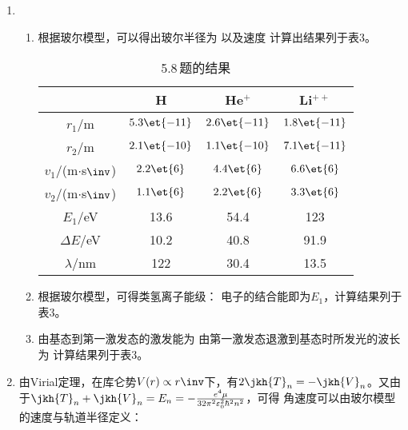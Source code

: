 \begin{enumerate}[label=\textbf{5.\arabic*}, listparindent=\parindent]
\item 
\begin{enumerate}[label=(\arabic*)]
    \item 根据玻尔模型，可以得出玻尔半径为
    以及速度
    计算出结果列于表3。
    \begin{table}[h]
        \centering
        \begin{tabular}{c|c|c|c}
            \hline
            & H & He$^+$ & Li$^{++}$ \\
            \hline
            $r_1$/m & $5.3\et{-11}$ & $2.6\et{-11}$ & $1.8\et{-11}$ \\
            $r_2$/m & $2.1\et{-10}$ & $1.1\et{-10}$ & $7.1\et{-11}$ \\
            \hline
            $v_1$/(m$\cdot$s$\inv$) & $2.2\et{6}$ & $4.4\et{6}$ & $6.6\et{6}$ \\
            $v_2$/(m$\cdot$s$\inv$) & $1.1\et{6}$ & $2.2\et{6}$ & $3.3\et{6}$ \\
            \hline
            $E_1$/eV & 13.6 & 54.4 & 123 \\
            \hline
            $\Delta E$/eV & 10.2 & 40.8 & 91.9 \\
            $\lambda$/nm & 122 & 30.4 & 13.5 \\
            \hline
        \end{tabular}
        \caption{5.8\,题的结果}
        \label{tab:my_label}
    \end{table}
    
    \item 根据玻尔模型，可得类氢离子能级：
    电子的结合能即为$E_1$，计算结果列于表3。
    
    \item 由基态到第一激发态的激发能为
    由第一激发态退激到基态时所发光的波长为
    计算结果列于表3。
\end{enumerate}

\item 由Virial定理，在库仑势$V(r)\propto r\inv$下，有$2\jkh{T}_n=-\jkh{V}_n$。又由于$\jkh{T}_n+\jkh{V}_n=E_n=-\frac{e^4\mu}{32\pi^2\varepsilon_0^2\hbar^2n^2}$，可得
角速度可以由玻尔模型的速度与轨道半径定义：


\end{enumerate}
